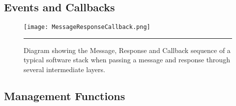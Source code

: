 
\FloatBarrier
\subsection{Events and Callbacks}

\begin{figure}[tbph]
	\vspace{1em}
	\centering
		\texttt{[image: MessageResponseCallback.png]}
	\rule{35em}{0.5pt}
	\caption[Diagram of the Message, Response and Callback sequence]{Diagram showing the Message, Response and Callback sequence of a typical software stack when passing a message and response through several intermediate layers.}
	\label{fig:messageresponsecallback}
\end{figure}


\FloatBarrier
\subsection{Management Functions}


